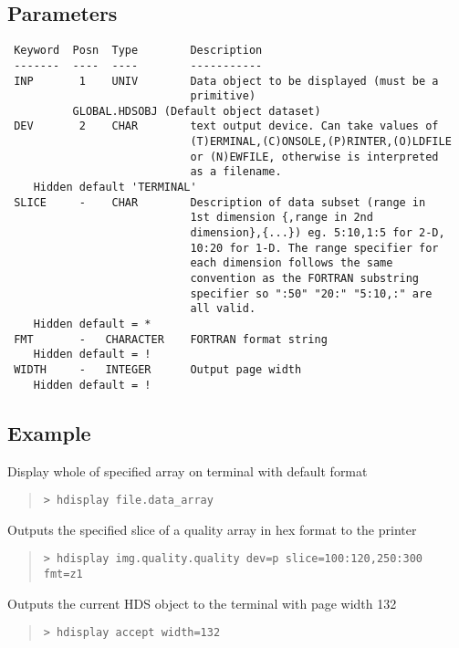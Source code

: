 \documentclass{book}
\renewcommand{\_}{{\tt\char'137}}     %
\begin{document}
\subsection{Parameters}
\begin{verbatim}
 Keyword  Posn  Type        Description
 -------  ----  ----        -----------
 INP       1    UNIV        Data object to be displayed (must be a
                            primitive)
          GLOBAL.HDSOBJ (Default object dataset)
 DEV       2    CHAR        text output device. Can take values of
                            (T)ERMINAL,(C)ONSOLE,(P)RINTER,(O)LDFILE
                            or (N)EWFILE, otherwise is interpreted
                            as a filename.
    Hidden default 'TERMINAL'
 SLICE     -    CHAR        Description of data subset (range in
                            1st dimension {,range in 2nd
                            dimension},{...}) eg. 5:10,1:5 for 2-D,
                            10:20 for 1-D. The range specifier for
                            each dimension follows the same
                            convention as the FORTRAN substring
                            specifier so ":50" "20:" "5:10,:" are
                            all valid.
    Hidden default = *
 FMT       -   CHARACTER    FORTRAN format string
    Hidden default = !
 WIDTH     -   INTEGER      Output page width
    Hidden default = !

\end{verbatim}\subsection{Example}
Display whole of specified array on terminal with default format
\begin{quote}\begin{verbatim}
> hdisplay file.data_array
\end{verbatim}\end{quote}
Outputs the specified slice of a
quality array in hex format to the printer
\begin{quote}\begin{verbatim}
> hdisplay img.quality.quality dev=p slice=100:120,250:300 fmt=z1
\end{verbatim}\end{quote}
Outputs the current HDS object to the terminal with page width 132
\begin{quote}\begin{verbatim}
> hdisplay accept width=132
\end{verbatim}\end{quote}
\end{document}
